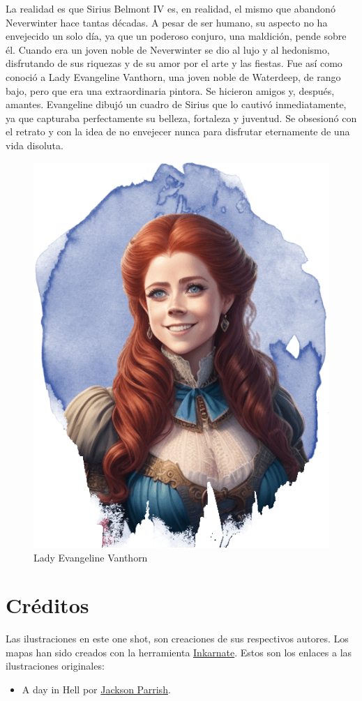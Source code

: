 \documentclass[10pt,twoside,twocolumn,openany]{dndbook}
\begin{document}
La realidad es que Sirius Belmont IV es, en realidad, el mismo que abandonó Neverwinter hace tantas 
décadas. A pesar de ser humano, su aspecto no ha envejecido un solo día, ya que un poderoso conjuro, 
una maldición, pende sobre él. Cuando era un joven noble de Neverwinter se dio al lujo y al 
hedonismo, disfrutando de sus riquezas y de su amor por el arte y las fiestas. Fue así como conoció
a Lady Evangeline Vanthorn, una joven noble de Waterdeep, de rango bajo, pero que era una 
extraordinaria pintora. Se hicieron amigos y, después, amantes. Evangeline dibujó un cuadro de 
Sirius que lo cautivó inmediatamente, ya que capturaba perfectamente su belleza, fortaleza y 
juventud. Se obsesionó con el retrato y con la idea de no envejecer nunca para disfrutar 
eternamente de una vida disoluta.

\begin{figure}
  \centering
  \includegraphics[width=0.9\columnwidth]{media/evangeline-vanthorn.png}
  \caption{Lady Evangeline Vanthorn}
\end{figure}


\section{Créditos}

Las ilustraciones en este one shot, son creaciones de sus respectivos autores. Los mapas han sido 
creados con la herramienta \href{https://inkarnate.com/}{Inkarnate}. Estos son los enlaces a las 
ilustraciones originales:

\begin{itemize}
  \item A day in Hell por \href{https://licensing.pixels.com/featured/a-day-in-hell-jackson-parrish.html}{Jackson Parrish}.
\end{itemize}
\end{document}
